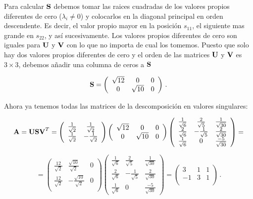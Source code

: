\documentclass[
]{agujournal2019}
\begin{document}
Para calcular \({\textbf S}\) debemos tomar las raices cuadradas de los
valores propios diferentes de cero (\(\lambda_i\ne0\)) y colocarlos en
la diagonal principal en orden descendente. Es decir, el valor propio
mayor en la posición \(s_{11}\), el siguiente mas grande en \(s_{22}\),
y así sucesivamente. Los valores propios diferentes de cero son iguales
para \({\textbf U}\) y \({\textbf V}\) con lo que no importa de cual los
tomemos. Puesto que solo hay dos valores propios diferentes de cero y el
orden de las matrices \({\textbf U}\) y \({\textbf V}\) es \(3\times3\),
debemos añadir una columna de ceros a \({\textbf S}\)

\[{\textbf S}=\left(\begin{array}{ccc}
  \sqrt{12} & 0 & 0 \\
  0 & \sqrt{10} & 0\\
      \end{array}\right)\,.\]

Ahora ya tenemos todas las matrices de la descomposición en valores
singulares:

\[{\textbf A}={\textbf U}{\textbf S}{\textbf V}^T=\left(\begin{array}{cc}
  \frac{1}{\sqrt{2}} & \frac{1}{\sqrt{2}} \\
  \frac{1}{\sqrt{2}} & -\frac{1}{\sqrt{2}} \\
      \end{array}\right)
      \left(\begin{array}{ccc}
  \sqrt{12} & 0 & 0 \\
  0 & \sqrt{10} & 0\\
      \end{array}\right)
      \left(\begin{array}{ccc}
  \frac{1}{\sqrt{6}} & \frac{2}{\sqrt{5}} & \frac{1}{\sqrt{30}}\\
  \frac{2}{\sqrt{6}} & -\frac{1}{\sqrt{5}} & \frac{2}{\sqrt{30}}\\
  \frac{1}{\sqrt{6}} & 0 & \frac{-5}{\sqrt{30}}
      \end{array}\right)=\]

\[=\left(\begin{array}{ccc}
  \frac{12}{\sqrt{2}} & \frac{\sqrt{10}}{\sqrt{2}} & 0\\
  \frac{12}{\sqrt{2}} & -\frac{\sqrt{10}}{\sqrt{2}} & 0\\
      \end{array}\right)
      \left(\begin{array}{ccc}
  \frac{1}{\sqrt{6}} & \frac{2}{\sqrt{5}} & \frac{1}{\sqrt{30}}\\
  \frac{2}{\sqrt{6}} & -\frac{1}{\sqrt{5}} & \frac{2}{\sqrt{30}}\\
  \frac{1}{\sqrt{6}} & 0 & \frac{-5}{\sqrt{30}}
      \end{array}\right)=
      \left(\begin{array}{ccc}
  3 & 1 & 1 \\
  -1 & 3 & 1\\
      \end{array}\right)\,.\]
\end{document}
